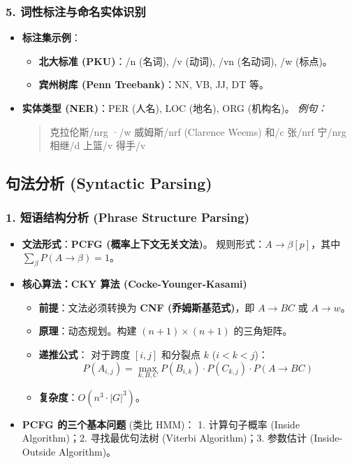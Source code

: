 \documentclass[a4paper, 11pt]{ctexart}
\begin{document}
\subsubsection{5. 词性标注与命名实体识别}
\begin{itemize}
    \item \textbf{标注集示例}：
    \begin{itemize}
        \item \textbf{北大标准 (PKU)}：/n (名词), /v (动词), /vn (名动词), /w (标点)。
        \item \textbf{宾州树库 (Penn Treebank)}：NN, VB, JJ, DT 等。
    \end{itemize}
    \item \textbf{实体类型 (NER)}：PER (人名), LOC (地名), ORG (机构名)。
    \textit{例句：}
    \begin{quote}
        克拉伦斯/nrg ·/w 威姆斯/nrf (Clarence Weems) 和/c 张/nrf 宁/nrg 相继/d 上篮/v 得手/v
    \end{quote}
\end{itemize}

\subsection{句法分析 (Syntactic Parsing)}

\subsubsection{1. 短语结构分析 (Phrase Structure Parsing)}
\begin{itemize}
    \item \textbf{文法形式}：\textbf{PCFG (概率上下文无关文法)}。
    规则形式：$A \to \beta [p]$，其中 $\sum_{\beta} P(A \to \beta) = 1$。
    \item \textbf{核心算法：CKY 算法 (Cocke-Younger-Kasami)}
    \begin{itemize}
        \item \textbf{前提}：文法必须转换为 \textbf{CNF (乔姆斯基范式)}，即 $A \to BC$ 或 $A \to w$。
        \item \textbf{原理}：动态规划。构建 $(n+1) \times (n+1)$ 的三角矩阵。
        \item \textbf{递推公式}：
        对于跨度 $[i, j]$ 和分裂点 $k$ ($i < k < j$)：
        $$ P(A_{i,j}) = \max_{k, B, C} P(B_{i,k}) \cdot P(C_{k,j}) \cdot P(A \to BC) $$
        \item \textbf{复杂度}：$O(n^3 \cdot |G|^3)$。
    \end{itemize}
    \item \textbf{PCFG 的三个基本问题} (类比 HMM)：
    1. 计算句子概率 (Inside Algorithm)；2. 寻找最优句法树 (Viterbi Algorithm)；3. 参数估计 (Inside-Outside Algorithm)。
\end{itemize}
\end{document}

